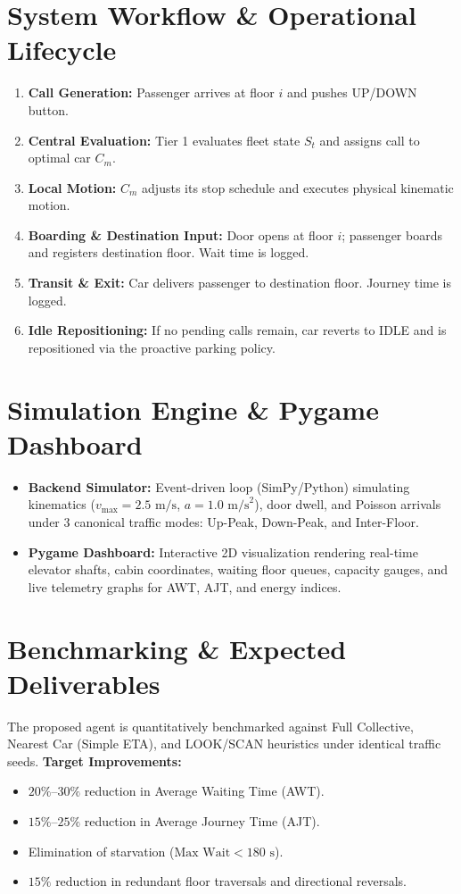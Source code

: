 \documentclass[10pt,a4paper,twocolumn]{article}
\begin{document}
\section{System Workflow \& Operational Lifecycle}
\begin{enumerate}
    \item \textbf{Call Generation:} Passenger arrives at floor $i$ and pushes UP/DOWN button.
    \item \textbf{Central Evaluation:} Tier 1 evaluates fleet state $S_t$ and assigns call to optimal car $C_m$.
    \item \textbf{Local Motion:} $C_m$ adjusts its stop schedule and executes physical kinematic motion.
    \item \textbf{Boarding \& Destination Input:} Door opens at floor $i$; passenger boards and registers destination floor. Wait time is logged.
    \item \textbf{Transit \& Exit:} Car delivers passenger to destination floor. Journey time is logged.
    \item \textbf{Idle Repositioning:} If no pending calls remain, car reverts to IDLE and is repositioned via the proactive parking policy.
\end{enumerate}

\section{Simulation Engine \& Pygame Dashboard}
\begin{itemize}
    \item \textbf{Backend Simulator:} Event-driven loop (SimPy/Python) simulating kinematics ($v_{\max} = 2.5\text{ m/s}$, $a = 1.0\text{ m/s}^2$), door dwell, and Poisson arrivals under 3 canonical traffic modes: Up-Peak, Down-Peak, and Inter-Floor.
    \item \textbf{Pygame Dashboard:} Interactive 2D visualization rendering real-time elevator shafts, cabin coordinates, waiting floor queues, capacity gauges, and live telemetry graphs for AWT, AJT, and energy indices.
\end{itemize}

\section{Benchmarking \& Expected Deliverables}
The proposed agent is quantitatively benchmarked against Full Collective, Nearest Car (Simple ETA), and LOOK/SCAN heuristics under identical traffic seeds.
\textbf{Target Improvements:}
\begin{itemize}
    \item $20\%$--$30\%$ reduction in Average Waiting Time (AWT).
    \item $15\%$--$25\%$ reduction in Average Journey Time (AJT).
    \item Elimination of starvation ($\text{Max Wait} < 180\text{ s}$).
    \item $15\%$ reduction in redundant floor traversals and directional reversals.
\end{itemize}
\end{document}
